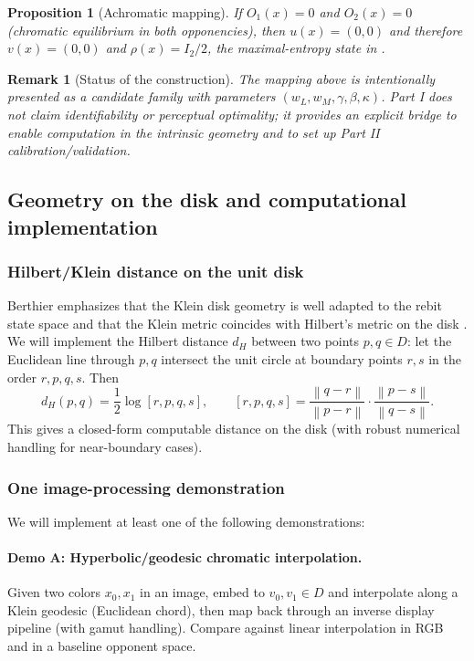 \documentclass[11pt]{article}
\newtheorem{proposition}{Proposition}
\newtheorem{remark}{Remark}
\newcommand{\norm}[1]{\left\lVert #1 \right\rVert}
\begin{document}
\begin{proposition}[Achromatic mapping]
If $O_1(x)=0$ and $O_2(x)=0$ (chromatic equilibrium in both opponencies), then $u(x)=(0,0)$ and therefore $v(x)=(0,0)$ and $\rho(x)=I_2/2$, the maximal-entropy state in \cite{Berthier2020}.
\end{proposition}

\begin{remark}[Status of the construction]
The mapping above is intentionally presented as a \emph{candidate family} with parameters $(w_L,w_M,\gamma,\beta,\kappa)$.
Part I does not claim identifiability or perceptual optimality; it provides an explicit bridge to enable computation in the intrinsic geometry and to set up Part II calibration/validation.
\end{remark}

\subsection{Geometry on the disk and computational implementation}

\subsubsection{Hilbert/Klein distance on the unit disk}
Berthier emphasizes that the Klein disk geometry is well adapted to the rebit state space and that the Klein metric coincides with Hilbert's metric on the disk \cite{Berthier2020}.
We will implement the Hilbert distance $d_H$ between two points $p,q\in D$:
let the Euclidean line through $p,q$ intersect the unit circle at boundary points $r,s$ in the order $r,p,q,s$.
Then
\begin{equation}
d_H(p,q)=\frac12\log[r,p,q,s],\qquad
[r,p,q,s]=\frac{\norm{q-r}}{\norm{p-r}}\cdot\frac{\norm{p-s}}{\norm{q-s}}.
\end{equation}
This gives a closed-form computable distance on the disk (with robust numerical handling for near-boundary cases).

\subsubsection{One image-processing demonstration}
We will implement at least one of the following demonstrations:

\paragraph{Demo A: Hyperbolic/geodesic chromatic interpolation.}
Given two colors $x_0,x_1$ in an image, embed to $v_0,v_1\in D$ and interpolate along a Klein geodesic (Euclidean chord), then map back through an inverse display pipeline (with gamut handling).
Compare against linear interpolation in RGB and in a baseline opponent space.
\end{document}
